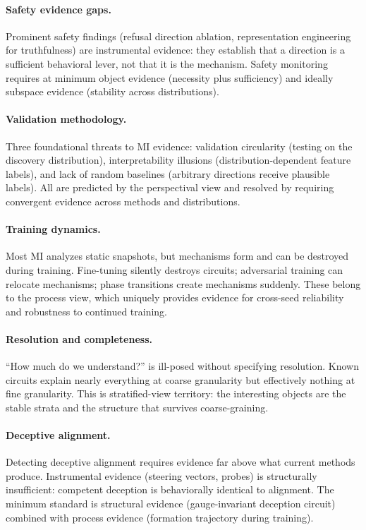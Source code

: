 \documentclass[11pt]{article}
\theoremstyle{remark}
\begin{document}
\paragraph{Safety evidence gaps.}
Prominent safety findings (refusal direction ablation, representation
engineering for truthfulness) are instrumental evidence: they establish
that a direction is a sufficient behavioral lever, not that it is the
mechanism.  Safety monitoring requires at minimum object evidence
(necessity plus sufficiency) and ideally subspace evidence (stability
across distributions).

\paragraph{Validation methodology.}
Three foundational threats to MI evidence: validation circularity
(testing on the discovery distribution), interpretability illusions
(distribution-dependent feature labels), and lack of random baselines
(arbitrary directions receive plausible labels).  All are predicted by
the perspectival view and resolved by requiring convergent evidence
across methods and distributions.

\paragraph{Training dynamics.}
Most MI analyzes static snapshots, but mechanisms form and can be
destroyed during training.  Fine-tuning silently destroys
circuits; adversarial training can relocate mechanisms; phase
transitions create mechanisms suddenly.  These belong to the process
view, which uniquely provides evidence for cross-seed reliability
and robustness to continued training.

\paragraph{Resolution and completeness.}
``How much do we understand?'' is ill-posed without specifying
resolution.  Known circuits explain nearly everything at coarse
granularity but effectively nothing at fine granularity.  This is
stratified-view territory: the interesting objects are the stable
strata and the structure that survives coarse-graining.

\paragraph{Deceptive alignment.}
Detecting deceptive alignment requires evidence far above what current
methods produce.  Instrumental evidence (steering vectors, probes) is
structurally insufficient: competent deception is behaviorally identical
to alignment.  The minimum standard is structural evidence
(gauge-invariant deception circuit) combined with process evidence
(formation trajectory during training).
\end{document}
